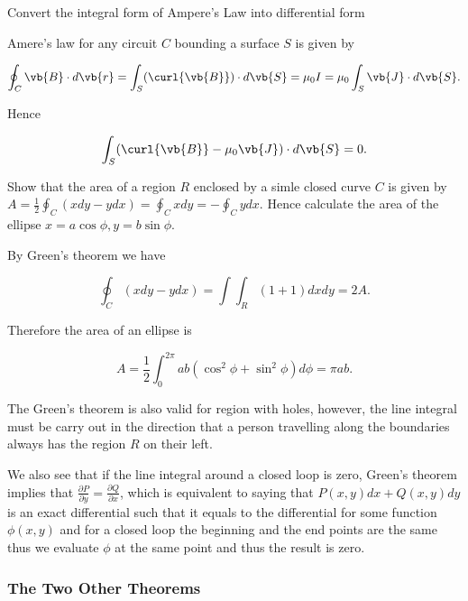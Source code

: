 \documentclass[english,a4paper,12pt]{report}
\begin{document}
{Convert the integral form of Ampere's Law into differential form}
{Amere's law for any circuit \(C\) bounding a surface \(S\) is given by 

\begin{equation}
	\oint_{C} \vb{B} \cdot d\vb{r} = \int_{S}^{} (\curl{\vb{B} } ) \cdot d\vb{S} =  \mu _{0} I = \mu _{0}  \int_{S}^{} \vb{J} \cdot d\vb{S} .  
\end{equation}

Hence 

\begin{equation}
	\int_{S}^{} (\curl{\vb{B} } - \mu _{0} \vb{J}  ) \cdot d\vb{S} = 0.
\end{equation}
}

{Show that the area of a region \(R\) enclosed by a simle closed curve \(C\) is given by \(A = \frac{1}{2} \oint_{C}(xdy - ydx) = \oint_{C}xdy = - \oint_{C}y dx\). Hence calculate the area of the ellipse \(x = a \cos \phi , y = b\sin \phi \). }
{By Green's theorem we have 

\begin{equation} \label{area} 
	\oint_{C} (xdy- ydx) = \int \int_{R}^{} (1+1) dxdy = 2A.  
\end{equation}

Therefore the area of an ellipse is 

\begin{equation}
	A = \frac{1}{2} \int_{0}^{2\pi } ab(\cos ^2\phi + \sin ^2\phi ) d\phi  = \pi ab.   
\end{equation}
} 

The Green's theorem is also valid for region with holes, however, the line integral must be carry out in the direction that a person travelling along the boundaries always has the region \(R\) on their left.

We also see that if the line integral around a closed loop is zero, Green's theorem implies that \(\frac{\partial P}{\partial y} = \frac{\partial Q}{\partial x} \), which is equivalent to saying that \(P(x,y) dx + Q(x,y) dy \) is an exact differential such that it equals to the differential for some function \(\phi (x,y)\) and for a closed loop the beginning and the end points are the same thus we evaluate \(\phi \) at the same point and thus the result is zero.

\subsubsection{The Two Other Theorems}
\end{document}
